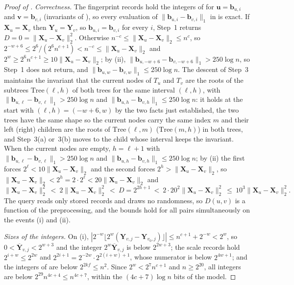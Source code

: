 \documentclass[11pt]{article}
\theoremstyle{remark}
\newcommand{\uu}{\mathbf u}
\newcommand{\XX}{\mathbf X}
\newcommand{\YY}{\mathbf{Y}}
\newcommand{\YYbar}{{\overline{\YY}}}
\newcommand{\norm}[1]{\lVert#1\rVert}
\newcommand{\bb}{\mathbf b}
\newcommand{\vv}{\mathbf v}
\begin{document}
\begin{proof}[Proof of ]
\emph{Correctness.}
The fingerprint records hold the integers of 
for $\uu=\bb_{u,i}$ and $\vv=\bb_{v,i}$ (invariants of
), so every evaluation of
$\norm{\bb_{u,i}-\bb_{v,i}}_1$ in  is exact.
If $\XX_u=\XX_v$ then $\YY_u=\YY_v$, so $\bb_{u,i}=\bb_{v,i}$ for every $i$,
Step~1 returns $D=0=\norm{\XX_u-\XX_v}_2^{2}$.
Otherwise $n^{-c}\le\norm{\XX_u-\XX_v}_2\le n^{c}$, so
$2^{-w+6}\le2^{6}/(2^{6}n^{c+1})<n^{-c}\le\norm{\XX_u-\XX_v}_2$ and
$2^{w}\ge2^{6}n^{c+1}\ge10\norm{\XX_u-\XX_v}_2$; by (ii),
$\norm{\bb_{u,-w+6}-\bb_{v,-w+6}}_1>250\log n$, so Step~1 does not return, and
$\norm{\bb_{u,w}-\bb_{v,w}}_1\le250\log n$.
The descent of Step~3 maintains the invariant that the current nodes of
$T_u$ and $T_v$ are the roots of the subtrees $\mathrm{Tree}(\ell,h)$ of both
trees for the same interval $(\ell,h)$, with
$\norm{\bb_{u,\ell}-\bb_{v,\ell}}_1>250\log n$ and
$\norm{\bb_{u,h}-\bb_{v,h}}_1\le250\log n$: it holds at the start with
$(\ell,h)=(-w+6,w)$ by the two facts just established, the two trees have
the same shape so the current nodes carry the same index $m$ and their
left (right) children are the roots of $\mathrm{Tree}(\ell,m)$
($\mathrm{Tree}(m,h)$) in both trees, and Step~3(a) or~3(b) moves to the
child whose interval keeps the invariant.
When the current nodes are empty, $h=\ell+1$ with
$\norm{\bb_{u,\ell}-\bb_{v,\ell}}_1>250\log n$ and
$\norm{\bb_{u,h}-\bb_{v,h}}_1\le250\log n$; by (ii) the first forces
$2^{\ell}<10\norm{\XX_u-\XX_v}_2$ and the second forces
$2^{h}>\norm{\XX_u-\XX_v}_2$, so
$\norm{\XX_u-\XX_v}_2<2^{h}=2\cdot2^{\ell}<20\norm{\XX_u-\XX_v}_2$ and
\[
\norm{\XX_u-\XX_v}_2^{2}\ <\ 2\norm{\XX_u-\XX_v}_2^{2}\ <\ D=2^{2h+1}
\ <\ 2\cdot20^{2}\norm{\XX_u-\XX_v}_2^{2}\ \le\ 10^{3}\norm{\XX_u-\XX_v}_2^{2}.
\]
The query reads only stored records and draws no randomness, so $D(u,v)$
is a function of the preprocessing, and the bounds hold for all pairs
simultaneously on the events (i) and (ii).

\emph{Sizes of the integers.}
On (i),
$|2^{-w}\lfloor2^{w}(\YY_{v,j}-\YY_{v_0,j})\rfloor|\le n^{c+1}+2^{-w}<2^{w}$,
so $0<\YYbar_{v,j}<2^{w+3}$ and the integer $2^{w}\YYbar_{v,j}$ is below
$2^{2w+3}$; the scale records hold $2^{i+w}\le2^{2w}$ and
$2^{2i+1}=2^{-2w}\cdot2^{2(i+w)+1}$, whose numerator is below $2^{4w+1}$; and
the integers of  are below $2^{2kf}\le n^{2}$.
Since $2^{w}<2^{7}n^{c+1}$ and $n\ge2^{20}$, all integers are below
$2^{29}n^{4c+4}\le n^{4c+7}$, within the $(4c+7)\log n$ bits of the model.


\end{proof}
\end{document}
